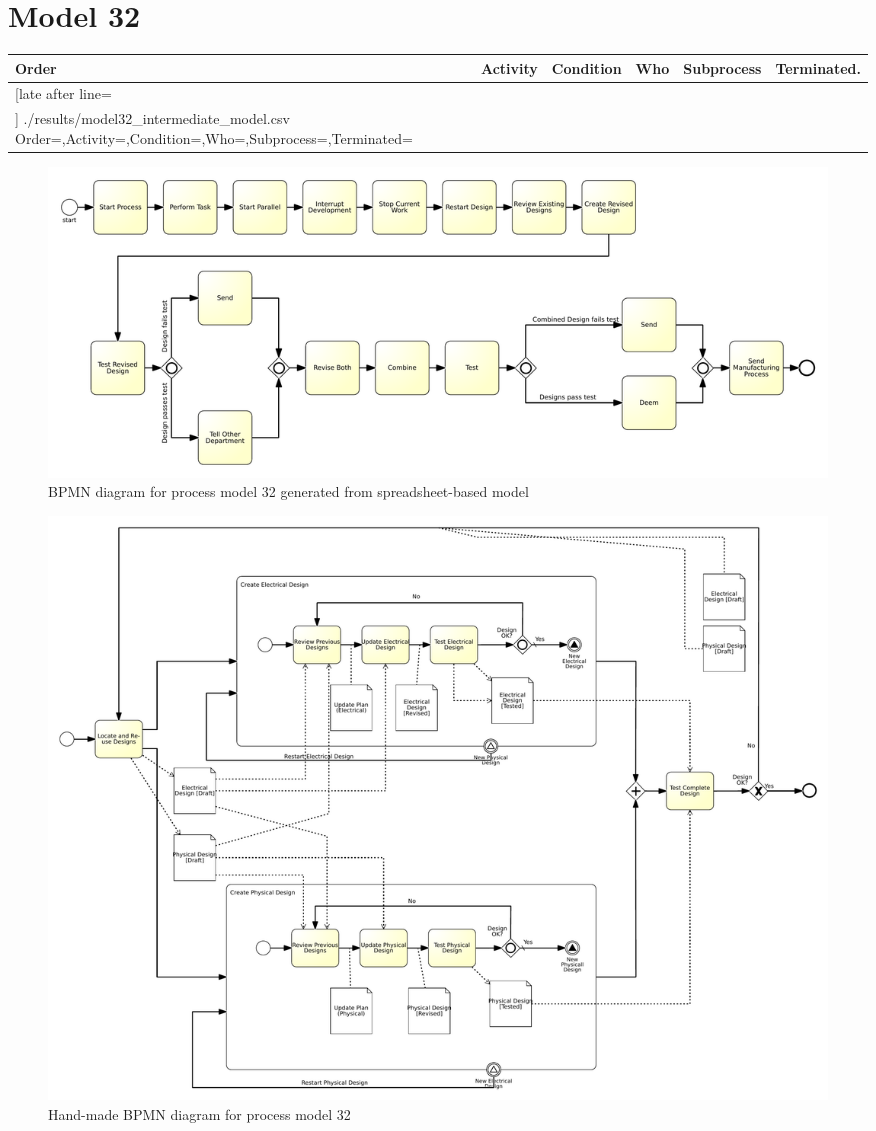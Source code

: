 \section{Model 32}
\begin{tcolorbox}[
	breakable,
	arc=0mm,
	left=1pt,
	right = 1pt,
	boxrule=0mm,
	colback = {white},
	]
	\texttt{}
\end{tcolorbox}
\label{txt:model32}

{\scriptsize
	\begin{longtable}{|p{0.03 \hsize}|p{0.25 \hsize}|p{0.15 \hsize}|p{0.2 \hsize}|p{0.1 \hsize}|p{0.1 \hsize}|}
		\hline
		Order & Activity & Condition & Who & Subprocess & Terminated.
		\\\hline\hline
		\csvreader[late after line=\\\hline]
		{./results/model32_intermediate_model.csv}
		{Order=\Order,Activity=\Activity,Condition=\Condition,Who=\Who,Subprocess=\Subprocess,Terminated=\Terminated}
		{\Order & \Activity & \Condition & \Who & \Subprocess & \Terminated}
		\caption{Spreadsheet-based description for process model 32}
		\label{csv:model32}
	\end{longtable}
}

\begin{figure}[H]
	\centering
	\includegraphics[width=\hsize]{./generated_bpmn/model32.pdf}
	\caption{BPMN diagram for process model 32 generated from spreadsheet-based model}
	\label{bpmn:generated_model32}
\end{figure}

\begin{figure}[H]
	\centering
	\includegraphics[width=0.95\textheight, angle=90]{./bpmn/model32.pdf}
	\caption{Hand-made BPMN diagram for process model 32}
	\label{bpmn:model32}
\end{figure}